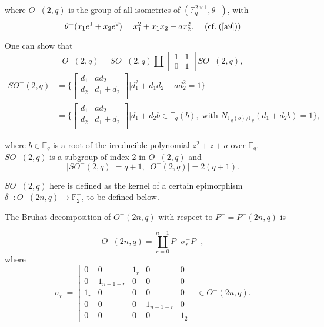 \documentclass[a4,12pt]{elsart}
\begin{document}
where $O^-(2,q)$ is the group of all isometries of $({\mathbb{F}}_q^{2 \times
1}, \theta^-)$, with
\begin{equation*}
 \theta^-(x_1 e^1+x_2e^2)=x_1^2+x_1x_2+a x_2^2. \; \; \; \; \; \textrm{(cf.\;(\ref{a9}))}
\end{equation*}

One can show that
\begin{equation}\label{a13}
O^{-}(2,q)=SO^{-}(2,q) \coprod \left[\begin{smallmatrix}
  1 &  1  \\
  0 &  1
\end{smallmatrix}
\right] SO^{-}(2,q),
\end{equation}
\begin{align*}
SO^{-}(2,q)&= \bigg\{
\begin{bmatrix}
  d_1& ad_2 \\
   d_{2}&d_{1}+d_{2} \\
\end{bmatrix} \bigg|d^{2}_{1}+d_{1}d_{2}+ad^{2}_{2}=1\bigg\}\\
 &=
 \bigg\{
\begin{bmatrix}
  d_1& ad_2 \\
   d_{2}&d_{1}+d_{2} \\
\end{bmatrix} \bigg|d_{1}+d_{2}b \in {\mathbb{F}}_q(b), \; \textrm{with } N_{{\mathbb{F}}_q(b)/{\mathbb{F}}_{q}}(d_1+d_{2}b)=1\bigg\},
\end{align*}

where $b \in \overline{{\mathbb{F}}_q}$ is a root of the irreducible
polynomial $z^2+z+a$ over ${\mathbb{F}}_q$. $ SO^- (2,q)$ is a subgroup of
index 2 in $O^{-}(2,q)$ and
\begin{equation*}
|SO^{-}(2,q)| = q+1, \; |O^{-}(2,q)|=2(q+1).
\end{equation*}

$SO^{- }(2,q)$ here is defined as the kernel of a certain
epimorphism $\delta^-:O^-(2n,q) \rightarrow {\mathbb{F}}_2^+$, to be defined
below.

The Bruhat decomposition of $O^-(2n,q)$ with respect to $P^-=P^-
(2n,q)$ is

\begin{equation}\label{a14}
O^-(2n,q) = \coprod_{r=0}^{n-1} P^- \sigma_r^-P^-,
\end{equation}where
\[
\sigma_r^- =
\begin{bmatrix}
   0   & 0         & 1_r  & 0  &0\\
   0   & 1_{n-1-r} & 0    & 0  &0\\
   1_r & 0         & 0    & 0  &0\\
   0   & 0         & 0    & 1_{n-1-r} &0\\
   0   & 0         & 0    &0        &1_2
\end{bmatrix}
\in O^-(2n,q).
\]
\end{document}
